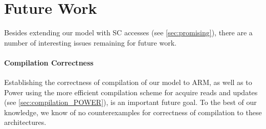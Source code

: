 \section{Future Work}\label{sec:discussion}

Besides extending our model with SC accesses
(see \cref{sec:promising}), 
there are a number of interesting issues remaining for future work.

\paragraph{Compilation Correctness}
Establishing the correctness of compilation of our model to ARM, as well as
to Power using the more efficient compilation scheme for acquire reads and updates 
(see \cref{sec:compilation_POWER}), is an important future goal. 
To the best of our knowledge, we know of no counterexamples
for correctness of compilation to these architectures. 


